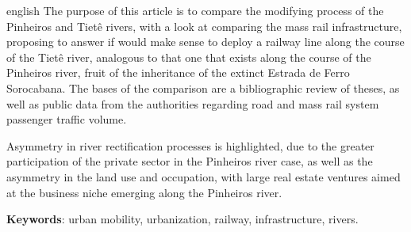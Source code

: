 \documentclass[
article,			%
11pt,				%
oneside,			%
a4paper,			%
english,			%
brazil,				%
sumario=tradicional
]{abntex2}
\begin{document}
	
	\emptythanks
	\maketitle
	
	\renewcommand{\resumoname}{Abstract}
	\begin{resumoumacoluna}
		\begin{otherlanguage*}{english}
			The purpose of this article is to compare the modifying process of the Pinheiros and Tietê rivers, with a look at comparing the mass rail infrastructure, proposing to answer if would make sense to deploy a railway line along the course of the Tietê river, analogous to that one that exists along the course of the Pinheiros river, fruit of the inheritance of the extinct Estrada de Ferro Sorocabana. The bases of the comparison are a bibliographic review of theses, as well as public data from the authorities regarding road and mass rail system passenger traffic volume.
			
			Asymmetry in river rectification processes is highlighted, due to the greater participation of the private sector in the Pinheiros river case, as well as the asymmetry in the land use and occupation, with large real estate ventures aimed at the business niche emerging along the Pinheiros river.
			
			\vspace{\onelineskip}
			
			\noindent
			\textbf{Keywords}: urban mobility, urbanization, railway, infrastructure, rivers.
		\end{otherlanguage*}
	\end{resumoumacoluna}
	
	
	\textual
	\cleardoublepage	%
	
%	
%	
	
\end{document}
